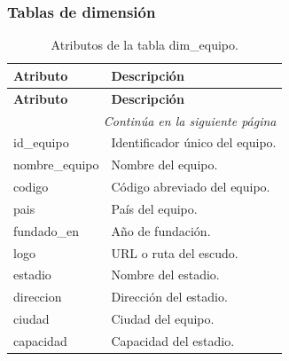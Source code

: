 \subsubsection{Tablas de dimensión}

\begin{longtable}{|l|l|}
\caption{Atributos de la tabla dim\_equipo.} \\

\hline
\textbf{Atributo} & \textbf{Descripción} \\
\hline
\endfirsthead

\hline
\textbf{Atributo} & \textbf{Descripción} \\
\hline
\endhead

\hline
\multicolumn{2}{r}{\textit{Continúa en la siguiente página}} \\
\hline
\endfoot

\hline
\endlastfoot

id\_equipo & Identificador único del equipo. \\
nombre\_equipo & Nombre del equipo. \\
codigo & Código abreviado del equipo. \\
pais & País del equipo. \\
fundado\_en & Año de fundación.\\
logo & URL o ruta del escudo.\\
estadio & Nombre del estadio.\\
direccion & Dirección del estadio. \\
ciudad & Ciudad del equipo. \\
capacidad & Capacidad del estadio. \\
\hline

\end{longtable}

